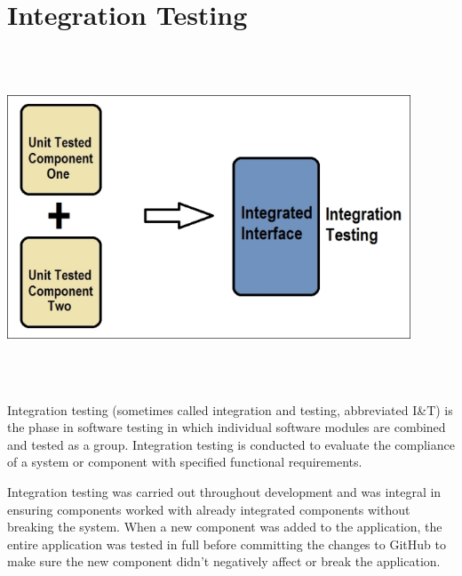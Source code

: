 \section{Integration Testing}
\begin{center}
    \includegraphics[width=12cm,height=10cm,keepaspectratio]{images/integration}
\end{center}
Integration testing (sometimes called integration and testing, abbreviated I&T) 
is the phase in software testing in which individual software modules are 
combined and tested as a group. Integration testing is conducted to evaluate the
compliance of a system or component with specified functional requirements.
\par
\bigskip
Integration testing was carried out throughout development and was integral in ensuring components worked with already integrated components without breaking the system. When a new component was added to the application, the entire application was tested in full before committing the changes to GitHub to make sure the new component didn't negatively affect or break the application. 

